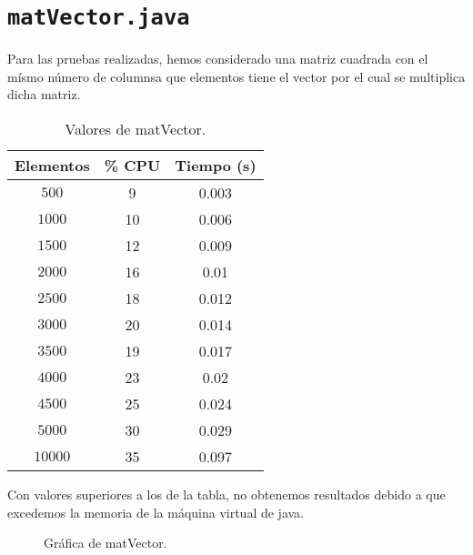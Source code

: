 \documentclass[12pt,letterpaper]{article}
\begin{document}
\section{\texttt{matVector.java}}
\noindent
Para las pruebas realizadas, hemos considerado una matriz cuadrada con el mísmo número de columnsa que elementos tiene el vector por el cual se multiplica dicha matriz.
\begin{center}
	\begin{table}[htbp]
		\begin{center}
			\begin{tabular}{|c|c|c|}
				\hline
				\textbf{Elementos} & \textbf{\% CPU} & \textbf{Tiempo (s)}  \\
				\hline 
				$500$ & 9 & 0.003\\ \hline	
				$1000$ & 10 & 0.006\\ \hline
				$1500$ & 12 & 0.009\\ \hline
				$2000$ & 16 & 0.01\\ \hline
				$2500$ & 18 & 0.012\\ \hline
				$3000$ & 20 & 0.014\\ \hline
				$3500$ & 19 & 0.017\\ \hline
				$4000$ & 23 & 0.02\\ \hline
				$4500$ & 25 & 0.024\\ \hline
				$5000$ & 30 & 0.029\\ \hline				
				$10000$ & 35 & 0.097\\ \hline	
			\end{tabular}
			\caption{Valores de matVector.}
			\label{tabla:Valores de matVector}
		\end{center}
	\end{table}
\end{center}
\noindent
Con valores superiores a los de la tabla, no obtenemos resultados debido a que excedemos la memoria de la máquina virtual de java.
\newpage
\begin{figure}
	\begin{center}
		\caption{Gráfica de matVector.}
		\label{fig: matVector}
	\end{center}
\end{figure}

\newpage
\end{document}
